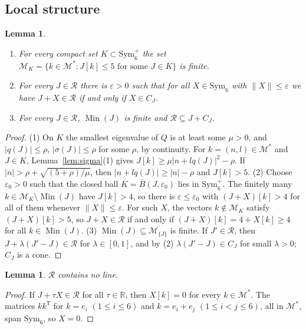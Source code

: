 \documentclass[11pt]{amsart}
\newtheorem{lemma}[theorem]{Lemma}
\theoremstyle{definition}
\theoremstyle{remark}
\numberwithin{equation}{section}
\numberwithin{table}{section}
\numberwithin{figure}{section}
\newcommand{\R}{\mathbb{R}}
\newcommand{\M}{\mathcal{M}}
\newcommand{\Rk}{\mathcal{R}}
\newcommand{\Sym}{\mathrm{Sym}}
\newcommand{\Min}{\operatorname{Min}}
\newcommand{\T}{\mathsf{T}}
\begin{document}
\subsection{Local structure}

\begin{lemma}\label{lem:local}
\begin{enumerate}
\item For every compact set $K\subset\Sym_6^+$ the set $\M_K=\{k\in\M^*: J[k]\le5\text{ for some }J\in K\}$ is finite.
\item For every $J\in\Rk$ there is $\varepsilon>0$ such that for all $X\in\Sym_6$ with $\|X\|\le\varepsilon$ we have $J+X\in\Rk$ if and only if $X\in C_J$.
\item For every $J\in\Rk$, $\Min(J)$ is finite and $\Rk\subseteq J+C_J$.
\end{enumerate}
\end{lemma}

\begin{proof}
(1) On $K$ the smallest eigenvalue of $Q$ is at least some $\mu>0$, and $|q(J)|\le\rho$, $|\sigma(J)|\le\rho$ for some $\rho$, by continuity. For $k=(n,l)\in\M^*$ and $J\in K$, Lemma~\ref{lem:sigma}(1) gives $J[k]\ge\mu|n+lq(J)|^2-\rho$. If $|n|>\rho+\sqrt{(5+\rho)/\mu}$, then $|n+lq(J)|\ge|n|-\rho$ and $J[k]>5$.
(2) Choose $\varepsilon_0>0$ such that the closed ball $K=\bar B(J,\varepsilon_0)$ lies in $\Sym_6^+$. The finitely many $k\in\M_K\setminus\Min(J)$ have $J[k]>4$, so there is $\varepsilon\le\varepsilon_0$ with $(J+X)[k]>4$ for all of them whenever $\|X\|\le\varepsilon$. For such $X$, the vectors $k\notin\M_K$ satisfy $(J+X)[k]>5$, so $J+X\in\Rk$ if and only if $(J+X)[k]=4+X[k]\ge4$ for all $k\in\Min(J)$.
(3) $\Min(J)\subseteq\M_{\{J\}}$ is finite. If $J'\in\Rk$, then $J+\lambda(J'-J)\in\Rk$ for $\lambda\in[0,1]$, and by (2) $\lambda(J'-J)\in C_J$ for small $\lambda>0$; $C_J$ is a cone.
\end{proof}

\begin{lemma}\label{lem:nolines}
$\Rk$ contains no line.
\end{lemma}

\begin{proof}
If $J+\tau X\in\Rk$ for all $\tau\in\R$, then $X[k]=0$ for every $k\in\M^*$. The matrices $kk^\T$ for $k=e_i$ $(1\le i\le6)$ and $k=e_i+e_j$ $(1\le i<j\le6)$, all in $\M^*$, span $\Sym_6$, so $X=0$.
\end{proof}
\end{document}
